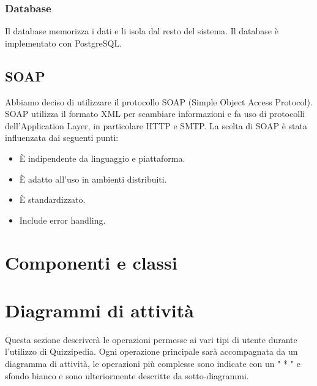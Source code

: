 \documentclass[a4paper, titlepage]{article}
\begin{document}
	\subsubsection{Database}
	Il database memorizza i dati e li isola dal resto del sistema. Il database è implementato con PostgreSQL. 
	
	\subsection{SOAP}
	Abbiamo deciso di utilizzare il protocollo SOAP (Simple Object Access Protocol).
	SOAP utilizza il formato XML per scambiare informazioni e fa uso di protocolli dell'Application Layer, in particolare HTTP e SMTP. La scelta di SOAP è stata influenzata dai seguenti punti:
	
	\begin{itemize}
		\item È indipendente da linguaggio e piattaforma.
		\item È adatto all'uso in ambienti distribuiti.
		\item È standardizzato.
		\item Include ­error handling.
	\end{itemize}
	
\newpage

\section{Componenti e classi}


\newpage
\section{Diagrammi di attività}
Questa sezione descriverà le operazioni permesse ai vari tipi di utente durante l’utilizzo di Quizzipedia. Ogni operazione principale sarà accompagnata da un diagramma di attività, le operazioni più complesse sono indicate con un " * " e sfondo bianco e sono ulteriormente descritte da sotto-diagrammi.
\end{document}
